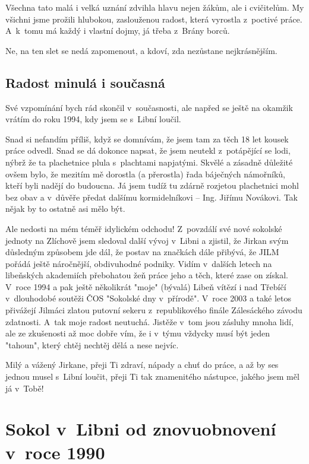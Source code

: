 \documentclass[a5paper, 11pt, twoside]{article}
\begin{document}
Všechna tato malá i velká uznání zdvihla hlavu nejen žákům, ale i
cvičitelům. My všichni jsme prožili hlubokou, zaslouženou radost, která
vyrostla z~poctivé práce. A~k~tomu má každý i vlastní dojmy, já třeba
z~Brány borců.

Ne, na ten slet se nedá zapomenout, a kdoví, zda nezůstane
nejkrásnějším.

\subsection{Radost minulá i
současná}

Své vzpomínání bych rád skončil v~současnosti, ale napřed se ještě na
okamžik vrátím do roku 1994, kdy jsem se s~Libní loučil.

Snad si nefandím příliš, když se domnívám, že jsem tam za těch 18 let
kousek práce odvedl. Snad se dá dokonce napsat, že jsem neutekl
z~potápějící se lodi, nýbrž že ta plachetnice plula s~plachtami napjatými.
Skvělé a zásadně důležité ovšem bylo, že mezitím mě dorostla (a
přerostla) řada báječných námořníků, kteří byli nadějí do budoucna. Já
jsem tudíž tu zdárně rozjetou plachetnici mohl bez obav a v~důvěře
předat dalšímu kormidelníkovi -- Ing. Jiřímu Novákovi. Tak nějak by to
ostatně asi mělo být.

Ale nedosti na mém téměř idylickém odchodu! Z~povzdálí své nové sokolské
jednoty na Zlíchově jsem sledoval další vývoj v~Libni a zjistil, že
Jirkan svým důsledným způsobem jde dál, že postav na značkách dále
přibývá, že JILM pořádá ještě náročnější, obdivuhodné podniky. Vidím
v~dalších letech na libeňských akademiích přebohatou žeň práce jeho a
těch, které zase on získal. V~roce 1994 a pak ještě několikrát "moje"
(bývalá) Libeň vítězí i nad Třebíčí v~dlouhodobé soutěži ČOS "Sokolské
dny v~přírodě". V~roce 2003 a také letos přivážejí Jilmáci zlatou
putovní sekeru z~republikového finále Zálesáckého závodu zdatnosti.
A~tak moje radost neutuchá. Jistěže v~tom jsou zásluhy mnoha lidí, ale ze
zkušenosti až moc dobře vím, že i v~týmu vždycky musí být jeden
"tahoun", který chtěj nechtěj dělá a nese nejvíc.

Milý a vážený Jirkane, přeji Ti zdraví, nápady a chuť do práce, a až by
ses jednou musel s~Libní loučit, přeji Ti tak znamenitého nástupce,
jakého jsem měl já v~Tobě!

\section{Sokol v~Libni od znovuobnovení v~roce 1990}
\end{document}
